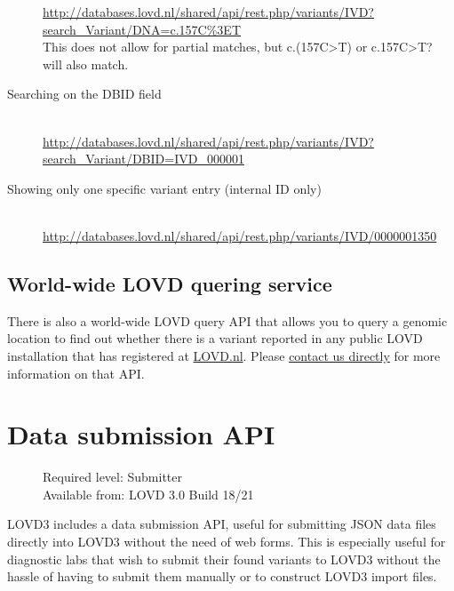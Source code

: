 \begin{description}
  \href{http://databases.lovd.nl/shared/api/rest.php/variants/IVD?search_Variant/DNA=c.157C\%3ET}
       {http://databases.lovd.nl/shared/api/rest.php/variants/IVD?\\
       \phantom{..........}search\_Variant/DNA=c.157C\%3ET}\\
       This does not allow for partial matches, but c.(157C>T) or c.157C>T? will also match.
  \item[Searching on the DBID field]\hfill \\
  \href{http://databases.lovd.nl/shared/api/rest.php/variants/IVD?search_Variant/DBID=IVD_000001}
       {http://databases.lovd.nl/shared/api/rest.php/variants/IVD?\\
       \phantom{..........}search\_Variant/DBID=IVD\_000001}
  \item[Showing only one specific variant entry (internal ID only)]\hfill \\
  \href{http://databases.lovd.nl/shared/api/rest.php/variants/IVD/0000001350}
       {http://databases.lovd.nl/shared/api/rest.php/variants/IVD/0000001350}
\end{description}



\subsection{World-wide LOVD quering service}
There is also a world-wide LOVD query API that allows you to query a genomic location to find out
 whether there is a variant reported in any public LOVD installation that has registered at
 \href{http://lovd.nl/3.0/public_list}{LOVD.nl}.
Please \href{http://www.lovd.nl/3.0/contact}{contact us directly} for more information on that API.
\clearpage





\section{Data submission API}
\begin{wrapfigure}[3]{r}{8cm} %
  \vspace{-25pt}
  \begin{leftbar}
    Required level: Submitter\\
    Available from: LOVD 3.0 Build 18/21
  \end{leftbar}
\end{wrapfigure}
LOVD3 includes a data submission API, useful for submitting JSON data files directly into LOVD3
 without the need of web forms.
This is especially useful for diagnostic labs that wish to submit their found variants
 to LOVD3 without the hassle of having to submit them manually or to construct LOVD3 import files.

